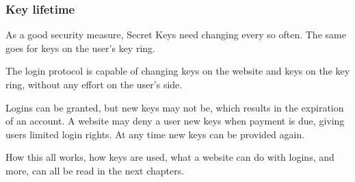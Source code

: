 \subsubsection{Key lifetime}
As a good security measure, Secret Keys need changing every so often.
The same goes for keys on the user's key ring.
\par
The login protocol is capable of changing keys on the website and keys on the key ring,
without any effort on the user's side.
\par
Logins can be granted,
but new keys may not be,
which results in the expiration of an account.
A website may deny a user new keys when payment is due,
giving users limited login rights.
At any time new keys can be provided again.
\par\vspace{10mm}\noindent
How this all works,
how keys are used,
what a website can do with logins,
and more,
can all be read in the next chapters.
